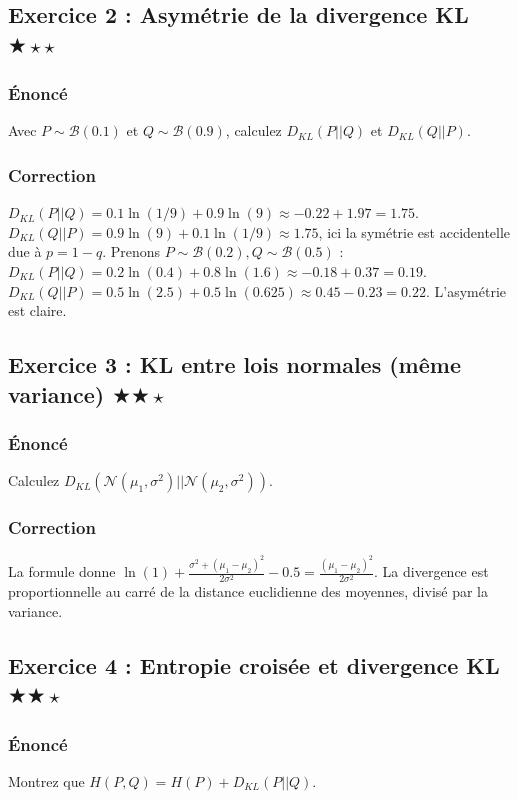 \documentclass[11pt,a4paper]{article}
\begin{document}
\subsection*{Exercice 2 : Asymétrie de la divergence KL \quad $\bigstar\star\star$}
\subsubsection*{Énoncé}
Avec $P \sim \mathcal{B}(0.1)$ et $Q \sim \mathcal{B}(0.9)$, calculez $D_{KL}(P||Q)$ et $D_{KL}(Q||P)$.
\subsubsection*{Correction}
$D_{KL}(P||Q) = 0.1 \ln(1/9) + 0.9 \ln(9) \approx -0.22 + 1.97 = 1.75$.
$D_{KL}(Q||P) = 0.9 \ln(9) + 0.1 \ln(1/9) \approx 1.75$, ici la symétrie est accidentelle due à $p = 1-q$.
Prenons $P \sim \mathcal{B}(0.2), Q \sim \mathcal{B}(0.5)$ :
$D_{KL}(P||Q) = 0.2 \ln(0.4) + 0.8 \ln(1.6) \approx -0.18 + 0.37 = 0.19$.
$D_{KL}(Q||P) = 0.5 \ln(2.5) + 0.5 \ln(0.625) \approx 0.45 - 0.23 = 0.22$.
L'asymétrie est claire.

\subsection*{Exercice 3 : KL entre lois normales (même variance) \quad $\bigstar\bigstar\star$}
\subsubsection*{Énoncé}
Calculez $D_{KL}(\mathcal{N}(\mu_1, \sigma^2) || \mathcal{N}(\mu_2, \sigma^2))$.
\subsubsection*{Correction}
La formule donne $\ln(1) + \frac{\sigma^2 + (\mu_1-\mu_2)^2}{2\sigma^2} - 0.5 = \frac{(\mu_1-\mu_2)^2}{2\sigma^2}$.
La divergence est proportionnelle au carré de la distance euclidienne des moyennes, divisé par la variance.

\subsection*{Exercice 4 : Entropie croisée et divergence KL \quad $\bigstar\bigstar\star$}
\subsubsection*{Énoncé}
Montrez que $H(P, Q) = H(P) + D_{KL}(P||Q)$.
\end{document}
